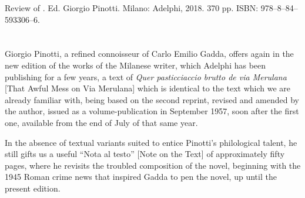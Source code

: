 


\begin{review}
\renewcommand*{\pagemark}{}


\begin{reviewed}
Review of \thecontribution. Ed. Giorgio Pinotti. Milano: Adelphi, 2018. 370 pp. ISBN:
978--8--84--593306--6.
\end{reviewed}


\section*{} 
Giorgio Pinotti, a refined connoisseur of Carlo Emilio Gadda, offers again
in the new edition of the works of the Milanese writer, which Adelphi has been publishing for a few years, a text of \emph{Quer pasticciaccio brutto de
via Merulana} {[}That Awful Mess on Via Merulana{]} which is
identical to the text which we are already familiar with, being
based on the second reprint, revised and amended by the author, issued
as a volume-publication in September 1957, soon after the first one,
available from the end of July of that same year.

In the absence of textual variants suited to entice Pinotti's
philological talent, he still gifts us a useful
``Nota al testo'' {[}Note on the Text{]} of approximately fifty
pages, where he revisits the troubled composition of the novel,
beginning with the 1945 Roman crime news that inspired Gadda to pen
the novel, up until the present edition.


\end{review}
